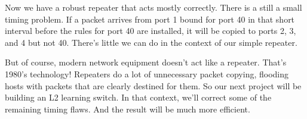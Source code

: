 Now we have a robust repeater that acts mostly correctly.  There is a still a small timing problem.  If a packet
arrives from port 1 bound for port 40 in that short interval before the rules for port 40 are installed, it
will be copied to ports 2, 3, and 4 but not 40.  There's little we can do in the context of our simple repeater.

But of course, modern network equipment doesn't act like a repeater.  That's 1980's technology!  Repeaters
do a lot of unnecessary packet copying, flooding hosts with packets that are clearly destined for them.  
So our next project will be building an L2 learning switch.  In that context, we'll correct some of the 
remaining timing flaws.  And the result will be much more efficient. 

